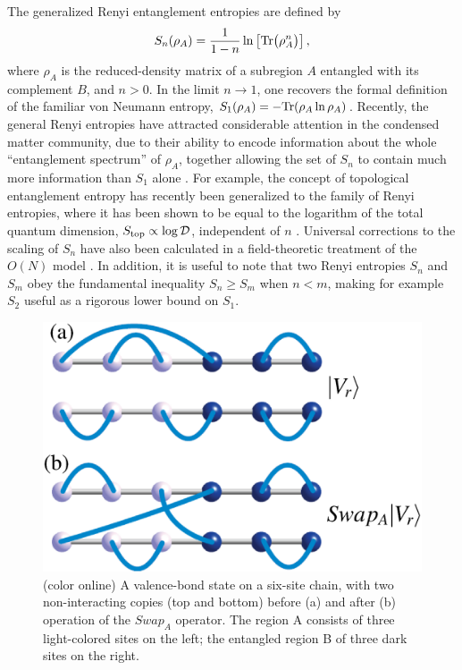 \documentclass[prl,aps,twocolumn,floatfix,amsmath,amssymb,superscriptaddress,tightenlines]{revtex4}
\begin{document}
The generalized Renyi entanglement entropies are defined by
\begin{equation}
S_{n} (\rho_A) = \frac{1}{1- n} \ln \left[{ {\rm Tr}\big( \rho_A^{n} \big) }\right],
\label{Sn}
\end{equation}
where $\rho_A$ is the reduced-density matrix of a subregion $A$ entangled with its complement $B$, and 
$n>0$.  In the limit $n \rightarrow 1$, one recovers the formal 
definition of the familiar von Neumann entropy, $S_1 (\rho_A) = - {\rm Tr}( \rho_A \ln \rho_A )$.  
Recently, the general Renyi entropies have attracted considerable attention in the condensed matter community, due to their ability to encode
information about the whole ``entanglement spectrum'' of $\rho_A$, together allowing the set of $S_{n}$ to contain 
much more information than $S_1$ alone \cite{Espec}.  For example, the concept of topological entanglement entropy has recently been
generalized to the family of Renyi entropies, where it has been shown to be equal to the logarithm of the total quantum 
dimension, $S_{\rm top} \propto \log {\mathcal D}$, independent of $n$ \cite{PI}.  Universal corrections to the scaling of $S_{n}$ 
have also been calculated in a field-theoretic treatment of the $O(N)$ model \cite{Max}.
In addition, it is useful to note that two Renyi entropies $S_{n}$ and $S_{m}$ obey the fundamental
inequality $S_{n} \geq S_{m}$ when $n < m$, making for example $S_2$ useful as a rigorous
lower bound on $S_1$.  

\begin{figure} {
\includegraphics[width=2.5
in]{swap_2.eps} \caption{(color online) 
\label{swap_2}
A valence-bond state on a six-site chain, with two non-interacting copies (top and bottom) before (a) and after (b) operation of the $Swap_A$ operator.  
The region A consists of three light-colored sites on the left; the entangled region B of three dark sites on the right.
}
} \end{figure}
\end{document}
